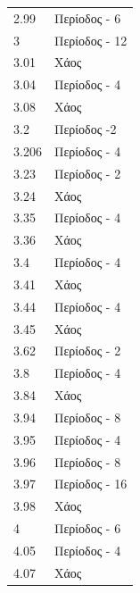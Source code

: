 \begin{table}[ht]
\begin{tabular}{l | l}
		2.99 &  Περίοδος -  6\\
		3 &  Περίοδος - 12\\
		3.01 &  Χάος\\
		3.04 & Περίοδος - 4\\
		3.08 & Χάος\\
		3.2 & Περίοδος -2\\
		3.206 & Περίοδος -  4\\
		3.23 & Περίοδος -  2\\
		3.24 & Χάος\\
		3.35 & Περίοδος -  4\\
		3.36 & Χάος\\
		3.4 & Περίοδος -  4\\
		3.41 & Χάος\\
		3.44 & Περίοδος -  4\\
		3.45 & Χάος\\
		3.62 & Περίοδος -  2\\
		3.8 & Περίοδος -  4\\
		3.84 & Χάος\\
		3.94 & Περίοδος -  8\\
		3.95 & Περίοδος -  4\\
		3.96 & Περίοδος -  8\\
		3.97 & Περίοδος -  16\\
		3.98 & Χάος\\
		4 & Περίοδος -  6\\
		4.05&Περίοδος - 4\\
		4.07 & Χάος\\
		
	\end{tabular}
	
\end{table}


